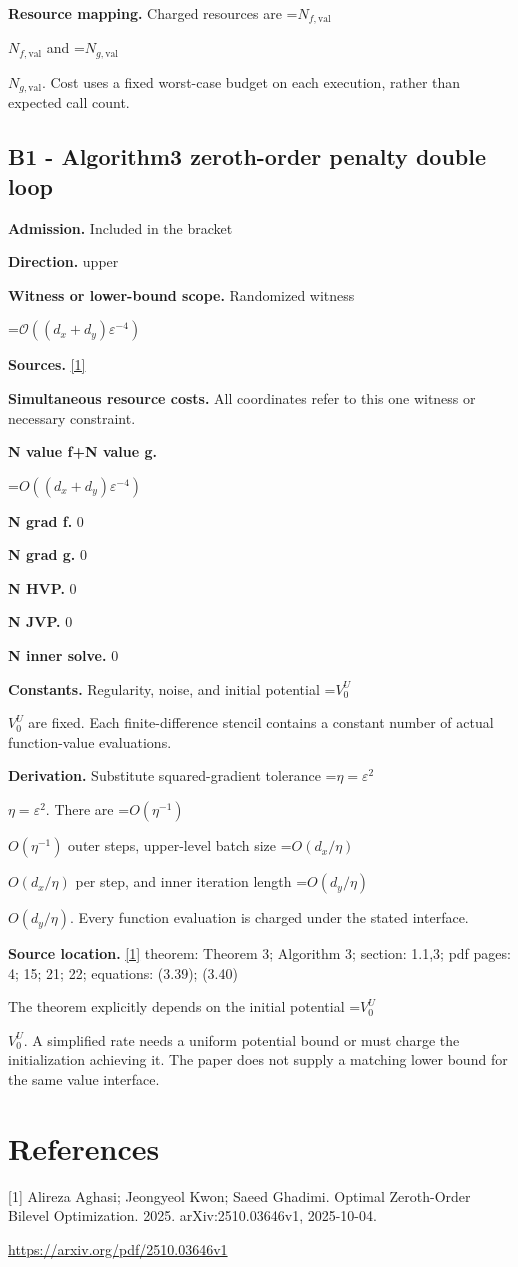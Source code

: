 \documentclass[10pt,a4paper]{article}
\newcommand{\AtlasMath}[1]{\par\begingroup\centering\setbox0=\hbox{$\displaystyle #1$}\ifdim\wd0>1.4\linewidth\typeout{ATLAS WIDE FORMULA: \the\wd0}\fi\ifdim\wd0>\linewidth\resizebox{\linewidth}{!}{\box0}\else\box0\fi\par\endgroup}
\newcommand{\AtlasInlineMath}[1]{\begingroup\setbox0=\hbox{$#1$}\ifdim\wd0>.4\linewidth\endgroup\AtlasMath{#1}\else\endgroup$#1$\fi}
\begin{document}
\textbf{Resource mapping.} Charged resources are \AtlasInlineMath{N_{f,\mathrm{val}}} and \AtlasInlineMath{N_{g,\mathrm{val}}}. Cost uses a fixed worst-case budget on each execution, rather than expected call count.

\subsection{B1 - Algorithm3 zeroth-order penalty double loop}
\textbf{Admission.} Included in the bracket

\textbf{Direction.} upper

\textbf{Witness or lower-bound scope.} Randomized witness

\AtlasMath{\mathcal{O}\!\left((d_x+d_y)\varepsilon^{-4}\right)}
\textbf{Sources.} \href{https://arxiv.org/pdf/2510.03646v1}{[1]}

\textbf{Simultaneous resource costs.} All coordinates refer to this one witness or necessary constraint.

\textbf{N value f+N value g.}

\AtlasMath{O((d_x+d_y)\varepsilon ^{-4})}
\textbf{N grad f.} 0

\textbf{N grad g.} 0

\textbf{N HVP.} 0

\textbf{N JVP.} 0

\textbf{N inner solve.} 0

\textbf{Constants.} Regularity, noise, and initial potential \AtlasInlineMath{V_0^U} are fixed. Each finite-difference stencil contains a constant number of actual function-value evaluations.

\textbf{Derivation.} Substitute squared-gradient tolerance \AtlasInlineMath{\eta=\varepsilon^2}. There are \AtlasInlineMath{O(\eta^{-1})} outer steps, upper-level batch size \AtlasInlineMath{O(d_x/\eta)} per step, and inner iteration length \AtlasInlineMath{O(d_y/\eta)}. Every function evaluation is charged under the stated interface.

\textbf{Source location.} \href{https://arxiv.org/pdf/2510.03646v1}{[1]} theorem: Theorem 3; Algorithm 3; section: 1.1,3; pdf pages: 4; 15; 21; 22; equations: (3.39); (3.40)

The theorem explicitly depends on the initial potential \AtlasInlineMath{V_0^U}. A simplified rate needs a uniform potential bound or must charge the initialization achieving it. The paper does not supply a matching lower bound for the same value interface.

\section{References}
[1] Alireza Aghasi; Jeongyeol Kwon; Saeed Ghadimi. Optimal Zeroth-Order Bilevel Optimization. 2025. arXiv:2510.03646v1, 2025-10-04.

\url{https://arxiv.org/pdf/2510.03646v1}
\end{document}
